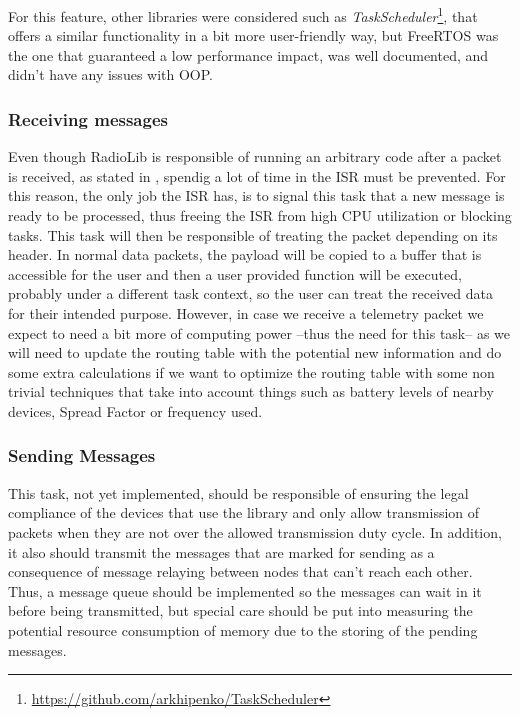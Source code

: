 For this feature, other libraries were considered such as \textit{TaskScheduler}\footnote{\url{https://github.com/arkhipenko/TaskScheduler}}, that offers a similar functionality in a bit more user-friendly way, but FreeRTOS was the one that guaranteed a low performance impact, was well documented, and didn't have any issues with OOP.

\subsubsection*{Receiving messages}
Even though RadioLib is responsible of running an arbitrary code after a packet is received, as stated in %
, spendig a lot of time in the ISR must be prevented. For this reason, the only job the ISR has, is to signal this task that a new message is ready to be processed, thus freeing the ISR from high CPU utilization or blocking tasks. This task will then be responsible of treating the packet depending on its header. In normal data packets, the payload will be copied to a buffer that is accessible for the user and then a user provided function will be executed, probably under a different task context, so the user can treat the received data for their intended purpose. However, in case we receive a telemetry packet we expect to need a bit more of computing power --thus the need for this task-- as we will need to update the routing table with the potential new information and do some extra calculations if we want to optimize the routing table with some non trivial techniques that take into account things such as battery levels of nearby devices, Spread Factor or frequency used.

\subsubsection*{Sending Messages}
This task, not yet implemented, should be responsible of ensuring the legal compliance of the devices that use the library and only allow transmission of packets when they are not over the allowed transmission duty cycle. In addition, it also should transmit the messages that are marked for sending as a consequence of message relaying between nodes that can't reach each other. Thus, a message queue should be implemented so the messages can wait in it before being transmitted, but special care should be put into measuring the potential resource consumption of memory due to the storing of the pending messages.
